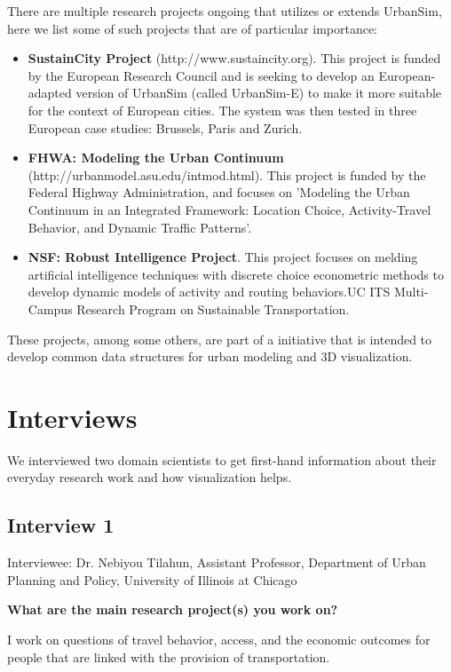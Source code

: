 \documentclass{egpubl}
\begin{document}
There are multiple research projects ongoing that utilizes or extends UrbanSim, here we list some of such projects that are of particular importance:
\begin{itemize}
  \item \textbf{SustainCity Project} (http://www.sustaincity.org). This project is funded by the European Research Council and is seeking to develop an European-adapted version of UrbanSim (called UrbanSim-E) to make it more suitable for the context of European cities. The system was then tested in three European case studies: Brussels, Paris and Zurich.
  \item \textbf{FHWA: Modeling the Urban Continuum} (http://urbanmodel.asu.edu/intmod.html). This project is funded by the Federal Highway Administration, and focuses on 'Modeling the Urban Continuum in an Integrated Framework: Location Choice, Activity-Travel Behavior, and Dynamic Traffic Patterns'.
  \item \textbf{NSF: Robust Intelligence Project}. This project focuses on melding artificial intelligence techniques with discrete choice econometric methods to develop dynamic models of activity and routing behaviors.UC ITS Multi-Campus Research Program on Sustainable Transportation.
\end{itemize}

These projects, among some others, are part of a initiative that is intended to develop common data structures for urban modeling and 3D visualization.

\section{Interviews}

We interviewed two domain scientists to get first-hand information about their everyday research work and how visualization helps.

\subsection{Interview 1}

Interviewee: Dr. Nebiyou Tilahun, Assistant Professor, Department of Urban Planning and Policy, University of Illinois at Chicago

\textbf{What are the main research project(s) you work on?}

I work on questions of travel behavior, access, and the economic outcomes for people that are linked with the provision of transportation.
\end{document}
